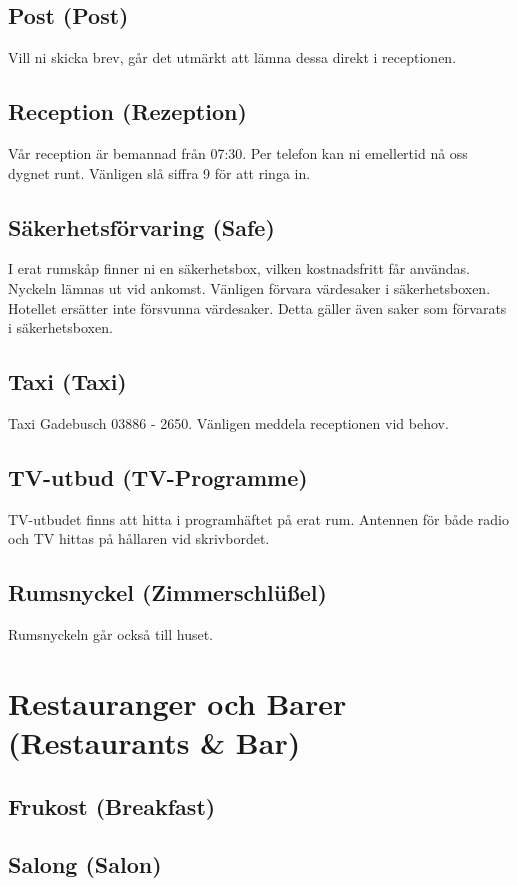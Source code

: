 \documentclass{report}
\begin{document}
\section{Post (Post)}
Vill ni skicka brev, går det utmärkt att lämna dessa direkt i receptionen.

\section{Reception (Rezeption)}
Vår reception är bemannad från 07:30. Per telefon kan ni emellertid nå oss dygnet runt. Vänligen slå siffra 9 för
att ringa in.
\section{Säkerhetsförvaring (Safe)}
I erat rumskåp finner ni en säkerhetsbox, vilken kostnadsfritt får användas.
Nyckeln lämnas ut vid ankomst.  Vänligen förvara värdesaker i säkerhetsboxen.
Hotellet ersätter inte försvunna värdesaker. Detta gäller även saker som
förvarats i säkerhetsboxen.

\section{Taxi (Taxi)}
Taxi Gadebusch 03886 - 2650. Vänligen meddela receptionen vid behov.

\section{TV-utbud (TV-Programme)}
TV-utbudet finns att hitta i programhäftet på erat rum. Antennen för både radio
och TV hittas på hållaren vid skrivbordet.

\section{Rumsnyckel (Zimmerschlüßel)}
Rumsnyckeln går också till huset.

\chapter{Restauranger och Barer (Restaurants \& Bar)}

\section{Frukost (Breakfast)}

\section{Salong (Salon)}
\end{document}
